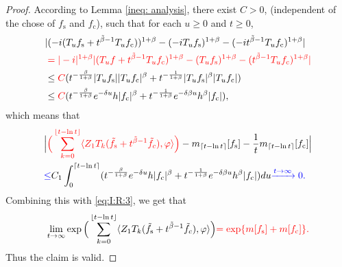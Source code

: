 \documentclass[12pt,a4paper]{amsart}
\theoremstyle{plain}
\theoremstyle{definition}
\numberwithin{equation}{section}
\begin{document}
\begin{proof}
{\color{red}According to Lemma \ref{ineq: analysis}, there exist $C>0$, (independent of the chose of $f_\mathrm s$ and $f_\mathrm c$), such that for each $u\geq 0$ and $t\geq 0$,}
\begin{align}
  &|(-i(T_uf_\mathrm s+t^{\tilde{\beta}-1}T_uf_\mathrm c))^{1+\beta}-(-iT_uf_\mathrm s)^{1+\beta}-(-it^{\tilde{\beta}-1}T_uf_\mathrm c)^{1+\beta}|
  \\& \color{red} = |-i|^{1+\beta} |(T_u f + t^{\tilde \beta -1} T_u f_\mathrm c)^{1+\beta} - (T_u f_\mathrm s)^{1+\beta} - (t^{\tilde \beta - 1}T_u f_\mathrm c)^{1+\beta}|
  \\&\leq {\color{red} C}(t^{-\frac{\beta}{1+\beta}}|T_uf_\mathrm s||T_uf_\mathrm c|^{\beta}+t^{-\frac{1}{1+\beta}}|T_uf_\mathrm s|^{\beta}|T_uf_\mathrm c|)\\
&\leq {\color{red}C}(t^{-\frac{\beta}{1+\beta}}e^{-\delta u}h|f_\mathrm c|^{\beta}+t^{-\frac{1}{1+\beta}}e^{-\delta\beta u}h^{\beta}|f_\mathrm c|),
\end{align}
which means that
\begin{align}
&\Big|{\color{red} \Big(\sum_{k=0}^{\lfloor t-\ln t \rfloor} \langle Z_1T_{k}(\tilde f_\mathrm s+t^{\tilde{\beta}-1}\tilde{f}_c), \varphi\rangle \Big)}-m_{\lceil t-\ln t \rceil}[f_\mathrm s]-\frac{1}{t}m_{\lceil t-\ln t \rceil}[f_\mathrm c]\Big|\\
&{\color{blue}\leq} C_1\int_0^{\lceil t-\ln t \rceil}(t^{-\frac{\beta}{1+\beta}}e^{-\delta u}h|f_\mathrm c|^{\beta}+t^{-\frac{1}{1+\beta}}e^{-\delta\beta u}h^{\beta}|f_\mathrm c|)du {\color{blue}\xrightarrow{t\rightarrow \infty} 0.}
\end{align}
Combining this with \eqref{eq:I:R:3}, we get that
\[
\lim_{t\rightarrow \infty}\exp\Big(\sum_{k=0}^{\lfloor t-\ln t \rfloor} \langle Z_1T_{k}(\tilde f_\mathrm s+t^{\tilde{\beta}-1}\tilde{f}_c), \varphi\rangle \Big) {\color{red} = \exp\{ m[f_\mathrm s]+m[f_\mathrm c]\}.}
\]
Thus the claim is valid.
\end{proof}
\end{document}
